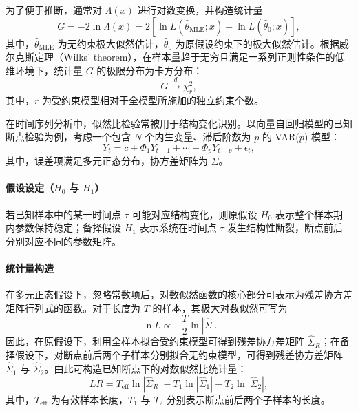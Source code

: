 为了便于推断，通常对 $\Lambda(x)$ 进行对数变换，并构造统计量
\begin{equation}
G=-2\ln\Lambda(x)=2\left[\ln L(\hat{\theta}_{\mathrm{MLE}};x)-\ln L(\hat{\theta}_0;x)\right],
\end{equation}
其中，$\hat{\theta}_{\mathrm{MLE}}$ 为无约束极大似然估计，$\hat{\theta}_0$ 为原假设约束下的极大似然估计。根据威尔克斯定理（Wilks' theorem），在样本量趋于无穷且满足一系列正则性条件的低维环境下，统计量 $G$ 的极限分布为卡方分布：
\begin{equation}
G \xrightarrow{d} \chi_r^2,
\end{equation}
其中，$r$ 为受约束模型相对于全模型所施加的独立约束个数。

在时间序列分析中，似然比检验常被用于结构变化识别。以向量自回归模型的已知断点检验为例，考虑一个包含 $N$ 个内生变量、滞后阶数为 $p$ 的 VAR($p$) 模型：
\begin{equation}
Y_t=c+\Phi_1Y_{t-1}+\cdots+\Phi_pY_{t-p}+\epsilon_t,
\end{equation}
其中，误差项满足多元正态分布，协方差矩阵为 $\Sigma$。

\paragraph{假设设定（$H_0$ 与 $H_1$）}若已知样本中的某一时间点 $\tau$ 可能对应结构变化，则原假设 $H_0$ 表示整个样本期内参数保持稳定；备择假设 $H_1$ 表示系统在时间点 $\tau$ 发生结构性断裂，断点前后分别对应不同的参数矩阵。

\paragraph{统计量构造}在多元正态假设下，忽略常数项后，对数似然函数的核心部分可表示为残差协方差矩阵行列式的函数。对于长度为 $T$ 的样本，其极大对数似然可写为
\begin{equation}
\ln L \propto -\frac{T}{2}\ln|\hat{\Sigma}|.
\end{equation}
因此，在原假设下，利用全样本拟合受约束模型可得到残差协方差矩阵 $\hat{\Sigma}_R$；在备择假设下，对断点前后两个子样本分别拟合无约束模型，可得到残差协方差矩阵 $\hat{\Sigma}_1$ 与 $\hat{\Sigma}_2$。由此可构造已知断点下的对数似然比统计量：
\begin{equation}
LR = T_{\mathrm{eff}}\ln|\hat{\Sigma}_R| - T_1\ln|\hat{\Sigma}_1| - T_2\ln|\hat{\Sigma}_2|,
\end{equation}
其中，$T_{\mathrm{eff}}$ 为有效样本长度，$T_1$ 与 $T_2$ 分别表示断点前后两个子样本的长度。

